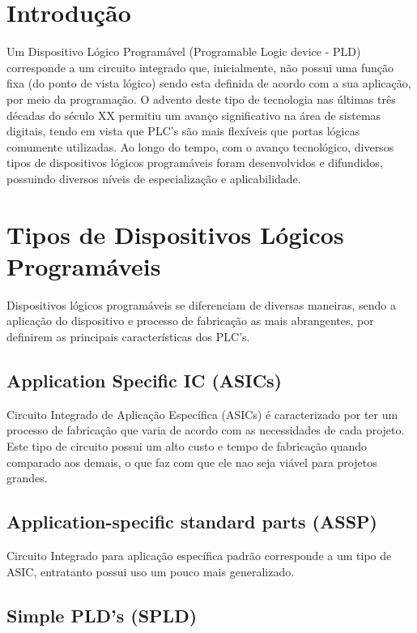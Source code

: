 
\section{\esp Introdução}

    Um Dispositivo Lógico Programável (Programable Logic device - PLD) corresponde a um circuito integrado que, inicialmente, não possui uma função fixa (do ponto de vista lógico) sendo esta definida de acordo com a sua aplicação, por meio da programação. O advento deste tipo de tecnologia nas últimas três décadas do século XX permitiu um avanço significativo na área de sistemas digitais, tendo em vista que PLC's são mais flexíveis que portas lógicas comumente utilizadas. Ao longo do tempo, com o avanço tecnológico, diversos tipos de dispositivos lógicos programáveis foram desenvolvidos e difundidos, possuindo diversos níveis de especialização e aplicabilidade.

\section{\esp Tipos de Dispositivos Lógicos Programáveis}

Dispositivos lógicos programáveis se diferenciam de diversas maneiras, sendo a aplicação do dispositivo e processo de fabricação as mais abrangentes, por definirem as principais características dos PLC's.

\subsection{\esp Application Specific IC (ASICs)}

Circuito Integrado de Aplicação Específica (ASICs) é caracterizado por ter um processo de fabricação que varia de acordo com as necessidades de cada projeto. Este tipo de circuito possui um alto custo e tempo de fabricação quando comparado aos demais, o que faz com que ele nao seja viável para projetos grandes. 

\subsection{\esp Application-specific standard parts (ASSP)}
Circuito Integrado para aplicação específica padrão corresponde a um tipo de ASIC, entratanto possui uso um pouco mais generalizado.


\subsection{\esp Simple PLD's (SPLD)}

